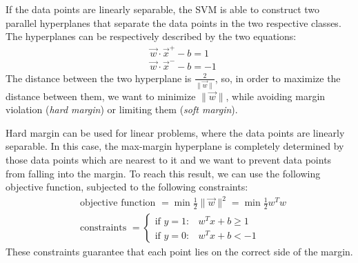 If the data points are linearly separable, the SVM is able to construct two parallel hyperplanes that separate the data points in the two respective classes. The hyperplanes can be respectively described by the two equations:
\begin{align}
    &\vec{w} \cdot \vec{x}^{+}-b=1 \\
    &\vec{w} \cdot \vec{x}^{-}-b=-1
\end{align}
The distance between the two hyperplane is $\frac{2}{\|\vec{w}\|}$, so, in order to maximize the distance between them, we want to minimize $\|\vec{w}\|$, while avoiding margin violation (\textit{hard margin}) or limiting them (\textit{soft margin}).

Hard margin can be used for linear problems, where the data points are linearly separable. In this case, the max-margin hyperplane is completely determined by those data points which are nearest to it and we want to prevent data points from falling into the margin. To reach this result, we can use the following objective function, subjected to the following constraints:
\begin{align}
    &\text{objective function }= \min \frac{1}{2}\|\vec{w}\|^2 =  \min \frac{1}{2} w^{T} w\\
    &\text{constraints }= \left\{\begin{array}{ll}{\text{if } y=1 :} & {w^{T} x+b \geq 1} \\ {\text{if } y=0 :} & {w^{T} x+b <-1}\end{array}\right.
\end{align}
These constraints guarantee that each point lies on the correct side of the margin.

